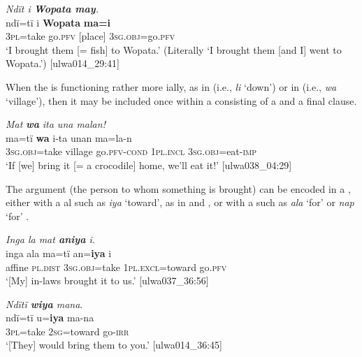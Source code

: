 \ea%
  \label{ex:complex:110}
          \textit{Ndït i \textbf{Wopata may}.}\\
\gll ndï=tï    i    \textbf{Wopata}  \textbf{ma=i}\\
    3\textsc{pl}=take  go.\textsc{pfv}  [place]    3\textsc{sg.obj}=go.\textsc{pfv}\\
\glt `I brought them [= fish] to Wopata.’ (Literally ‘I brought them [and I] went to Wopata.’) [ulwa014\_29:41]
\z

When the  is functioning rather more ially, as in  (i.e., \textit{li} ‘down’) or in  (i.e., \textit{wa} ‘village’), then it may be included once within a  consisting of a  and a final clause.

\ea%
    \label{ex:complex:111}
          \textit{Mat} \textbf{\textit{wa}} \textit{ita una malan!}\\
\gll    ma=tï      \textbf{wa}    i-ta        unan    ma=la-n\\
    3\textsc{sg.obj}=take  village  go.\textsc{pfv-cond}  \textsc{1pl.incl}  \textsc{3sg.obj=}eat-\textsc{imp}\\
\glt `If [we] bring it [= a crocodile] home, we’ll eat it!’ [ulwa038\_04:29]
\z

The  argument (the person to whom something is brought) can be encoded in a , either with a al  such as \textit{iya} ‘toward’, as in  and , or with a   such as \textit{ala} ‘for’  or \textit{nap} ‘for’ .

\ea%
    \label{ex:complex:112}
          \textit{Inga la mat \textbf{aniya} i.}\\
\gll inga  ala      ma=tï      an=\textbf{iya}     i\\
    affine  \textsc{pl.dist}  3\textsc{sg.obj}=take  1\textsc{pl.excl=}toward  go.\textsc{pfv}\\
\glt `[My] in-laws brought it to us.’ [ulwa037\_36:56]
\z

\ea%
    \label{ex:complex:113}
          \textit{Ndïtï \textbf{wiya} mana}.\\
\gll ndï=tï    u=\textbf{iya}      ma-na\\
    3\textsc{pl}=take  2\textsc{sg}=toward  go-\textsc{irr}\\
\glt `[They] would bring them to you.’ [ulwa014\_36:45]
\z

